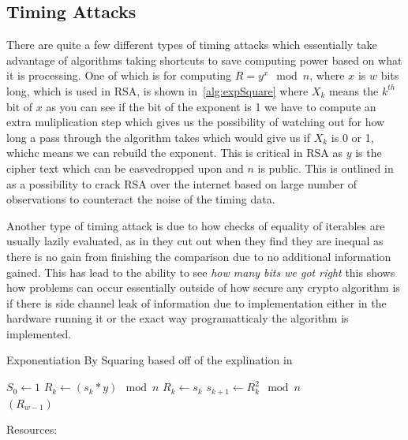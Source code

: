 \documentclass[a4paper,12pt]{article}
\begin{document}
\subsection{Timing Attacks}
There are quite a few different types of timing attacks which essentially take advantage of algorithms taking shortcuts to save computing power based on what it is processing. One of which is for computing $R = y^x \mod n$, where $x$ is $w$ bits long, which is used in RSA, is shown in~\ref{alg:expSquare} where $X_k$ means the $k^{th}$ bit of $x$ as you can see if the bit of the exponent is 1 we have to compute an extra muliplication step which gives us the possibility of watching out for how long a pass through the algorithm takes which would give us if $X_k$ is 0 or 1, whichc means we can rebuild the exponent. This is critical in RSA as $y$ is the cipher text which can be easvedropped upon and $n$ is public. This is outlined in \cite{crosbyTiming} as a possibility to crack RSA over the internet based on large number of observations to counteract the noise of the timing data.

Another type of timing attack is due to how checks of equality of iterables are usually lazily evaluated, as in they cut out when they find they are inequal as there is no gain from finishing the comparison due to no additional information gained. This has lead to the ability to see \emph{how many bits we got right} \cite{lessonInTiming} this shows how problems can occur essentially outside of how secure any crypto algorithm is if there is side channel leak of information due to implementation either in the hardware running it or the exact way programatticaly the algorithm is implemented.


\begin{algorithm}
    \caption{Exponentiation By Squaring based off of the explination in \cite{kocherTiming}}
    \label{alg:expSquare}
\begin{algorithmic}
    \State $S_0 \gets 1$
        \State $R_k \gets (s_k * y) \mod n$
    \Else
        \State $R_k \gets s_k$
    \EndIf
    \State $s_{k+1} \gets R_k^2 \mod n$
    \EndFor\\
    \Return $(R_{w-1})$
\end{algorithmic}
\end{algorithm}




Resources:
\end{document}
